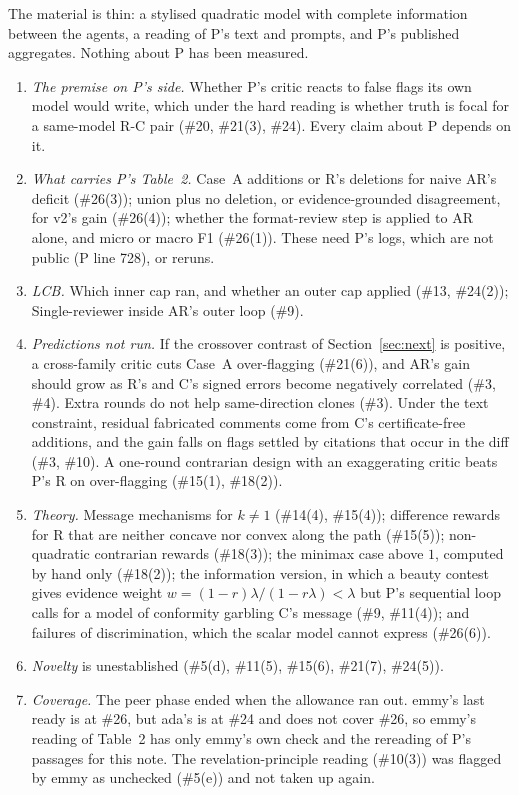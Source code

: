 \documentclass{article}
\begin{document}
The material is thin: a stylised quadratic model with complete
information between the agents, a reading of P's text and prompts, and
P's published aggregates. Nothing about P has been measured.
\begin{enumerate}
\item \emph{The premise on P's side.} Whether P's critic reacts to false
flags its own model would write, which under the hard reading is whether
truth is focal for a same-model R-C pair (\#20, \#21(3), \#24). Every
claim about P depends on it.
\item \emph{What carries P's Table~2.} Case~A additions or R's deletions
for naive AR's deficit (\#26(3)); union plus no deletion, or
evidence-grounded disagreement, for v2's gain (\#26(4)); whether the
format-review step is applied to AR alone, and micro or macro F1
(\#26(1)). These need P's logs, which are not public (P line 728), or
reruns.
\item \emph{LCB.} Which inner cap ran, and whether an outer cap applied
(\#13, \#24(2)); Single-reviewer inside AR's outer loop (\#9).
\item \emph{Predictions not run.} If the crossover contrast of
Section~\ref{sec:next} is positive, a cross-family critic cuts Case~A
over-flagging (\#21(6)), and AR's gain should grow as R's and C's signed
errors become negatively correlated (\#3, \#4). Extra rounds do not help
same-direction clones (\#3). Under the text constraint, residual
fabricated comments come from C's certificate-free additions, and the
gain falls on flags settled by citations that occur in the diff (\#3,
\#10). A one-round contrarian design with an exaggerating critic beats
P's R on over-flagging (\#15(1), \#18(2)).
\item \emph{Theory.} Message mechanisms for $k\ne1$ (\#14(4), \#15(4));
difference rewards for R that are neither concave nor convex along the
path (\#15(5)); non-quadratic contrarian rewards (\#18(3)); the minimax
case above $1$, computed by hand only (\#18(2)); the information version,
in which a beauty contest gives evidence weight
$w=(1-r)\lambda/(1-r\lambda)<\lambda$ but P's sequential loop calls for a
model of conformity garbling C's message (\#9, \#11(4)); and failures of
discrimination, which the scalar model cannot express (\#26(6)).
\item \emph{Novelty} is unestablished (\#5(d), \#11(5), \#15(6),
\#21(7), \#24(5)).
\item \emph{Coverage.} The peer phase ended when the allowance ran out.
emmy's last ready is at \#26, but ada's is at \#24 and does not cover
\#26, so emmy's reading of Table~2 has only emmy's own check and the
rereading of P's passages for this note. The revelation-principle reading
(\#10(3)) was flagged by emmy as unchecked (\#5(e)) and not taken up
again.
\end{enumerate}
\end{document}

